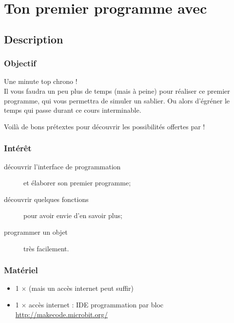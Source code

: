 \section{Ton premier programme avec \mb}


\pagestyle{mb}

\subsection{Description}

\subsubsection{Objectif}

\begin{formule}
Une minute top chrono !\\
Il vous faudra un peu plus de temps (mais à peine) pour réaliser ce premier programme, qui vous permettra de simuler un sablier. Ou alors d'égréner le temps qui passe durant ce cours interminable.

Voilà de bons prétextes pour découvrir les possibilités offertes par  \mb !
\end{formule}


\subsubsection{Intérêt}

\begin{description}
    \item [découvrir l'interface de programmation] et élaborer son premier programme;
    \item [découvrir quelques fonctions] pour avoir envie d'en savoir plus;
    \item [programmer un objet] très facilement.
\end{description}


\subsubsection{Matériel}
\begin{itemize}
    \item 1 $\times$ \matosMb (mais un accès internet peut suffir)
    \item 1 $\times$ accès internet : IDE programmation par bloc \url{http://makecode.microbit.org/}
\end{itemize}


